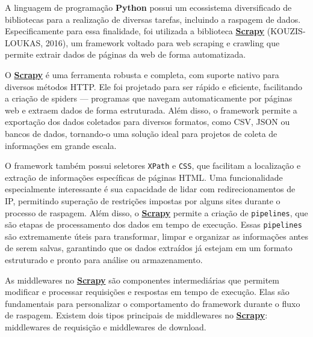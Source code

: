 \documentclass[
  12pt,
  a4paper,
]{scrreprt}
\begin{document}
\vspace{12pt}

A linguagem de programação \textbf{Python} possui um ecossistema
diversificado de bibliotecas para a realização de diversas tarefas,
incluindo a raspagem de dados. Especificamente para essa finalidade, foi
utilizada a biblioteca
\href{https://docs.scrapy.org/en/latest}{\textbf{Scrapy}}
(KOUZIS-LOUKAS, 2016), um framework voltado para web scraping e crawling
que permite extrair dados de páginas da web de forma automatizada.

\vspace{12pt}

O \href{https://docs.scrapy.org/en/latest}{\textbf{Scrapy}} é uma
ferramenta robusta e completa, com suporte nativo para diversos métodos
HTTP. Ele foi projetado para ser rápido e eficiente, facilitando a
criação de spiders --- programas que navegam automaticamente por páginas
web e extraem dados de forma estruturada. Além disso, o framework
permite a exportação dos dados coletados para diversos formatos, como
CSV, JSON ou bancos de dados, tornando-o uma solução ideal para projetos
de coleta de informações em grande escala.

\vspace{12pt}

O framework também possui seletores \texttt{XPath} e \texttt{CSS}, que
facilitam a localização e extração de informações específicas de páginas
HTML. Uma funcionalidade especialmente interessante é sua capacidade de
lidar com redirecionamentos de IP, permitindo superação de restrições
impostas por alguns sites durante o processo de raspagem. Além disso, o
\href{https://docs.scrapy.org/en/latest}{\textbf{Scrapy}} permite a
criação de \texttt{pipelines}, que são etapas de processamento dos dados
em tempo de execução. Essas \texttt{pipelines} são extremamente úteis
para transformar, limpar e organizar as informações antes de serem
salvas, garantindo que os dados extraídos já estejam em um formato
estruturado e pronto para análise ou armazenamento.

\vspace{12pt}

As middlewares no
\href{https://docs.scrapy.org/en/latest}{\textbf{Scrapy}} são
componentes intermediárias que permitem modificar e processar
requisições e respostas em tempo de execução. Elas são fundamentais para
personalizar o comportamento do framework durante o fluxo de raspagem.
Existem dois tipos principais de middlewares no
\href{https://docs.scrapy.org/en/latest}{\textbf{Scrapy}}: middlewares
de requisição e middlewares de download.
\end{document}

